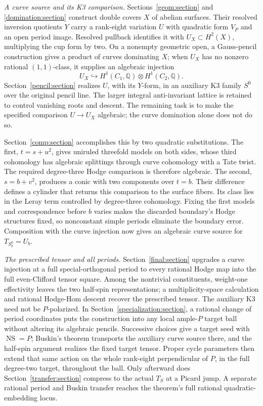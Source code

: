 \documentclass[11pt]{amsart}
\newcommand{\Q}{\mathbb Q}
\DeclareMathOperator{\NS}{NS}
\theoremstyle{definition}
\theoremstyle{remark}
\numberwithin{equation}{section}
\begin{document}
\emph{A curve source and its K3 comparison.}
Sections~\ref{geom:section} and \ref{domination:section} construct
double covers $X$ of abelian surfaces.  Their resolved inversion
quotients $Y$ carry a rank-eight variation $U$ with quadratic form
$V_P$ and an open period image.  Resolved pullback identifies it
with $U_X\subset H^2(X)$, multiplying the cup form by two.
On a nonempty geometric open, a Gauss-pencil construction gives a
product of curves dominating $X$;
when $U_X$ has no nonzero rational $(1,1)$-class, it supplies an
algebraic injection
\[
 U_X\hookrightarrow H^1(C_1,\Q)\otimes H^1(C_2,\Q).
\]
Section~\ref{pencil:section} realizes $U$, with its $Y$-form, in an
auxiliary K3 family $S^0$ over the original pencil line.  The larger
integral anti-invariant lattice is retained to control vanishing roots
and descent.  The remaining task is to make the specified comparison
$U\to U_X$ algebraic; the curve domination alone does not do so.

Section~\ref{comp:section} accomplishes this by two quadratic
substitutions.  The first, $t=s+u^2$, gives uniruled threefold models
on both sides, whose third cohomology has algebraic splittings through
curve cohomology with a Tate twist.  The required degree-three Hodge comparison is
therefore algebraic.  The second, $s=b+v^2$, produces a conic with
two components over $t=b$.  Their difference defines a cylinder that
returns this comparison to the surface fibers.  Its class lies in
the Leray term controlled by degree-three cohomology.  Fixing the first
models and correspondence before $b$ varies makes the discarded
boundary's Hodge structures fixed, so nonconstant simple periods
eliminate the boundary error.  Composition with the curve injection
now gives an algebraic curve source for $T_{S_b^0}=U_b$.

\emph{The prescribed tensor and all periods.}
Section~\ref{final:section} upgrades a curve injection at a full
special-orthogonal period to every rational Hodge map into the full
even-Clifford tensor square.  Among the nontrivial constituents,
weight-one effectivity leaves the two half-spin representations;
a multiplicity-space calculation and
rational Hodge-Hom descent recover the prescribed tensor.
The auxiliary K3 need not be $P$-polarized.
In Section~\ref{specialization:section}, a rational change of period
coordinates puts the construction into any local ample-$P$ target
ball without altering its algebraic pencils.  Successive choices
give a target seed with $\NS=P$; Buskin's theorem transports the
auxiliary curve source there, and the half-spin argument realizes the
fixed target tensor.  Proper cycle parameters then extend that same
action on the whole rank-eight perpendicular of $P$, in the full
degree-two target, throughout the ball.  Only afterward does
Section~\ref{transfer:section} compress to the actual $T_S$ at a
Picard jump.  A separate rational period and Buskin transfer reaches
the theorem's full rational quadratic-embedding locus.
\end{document}
